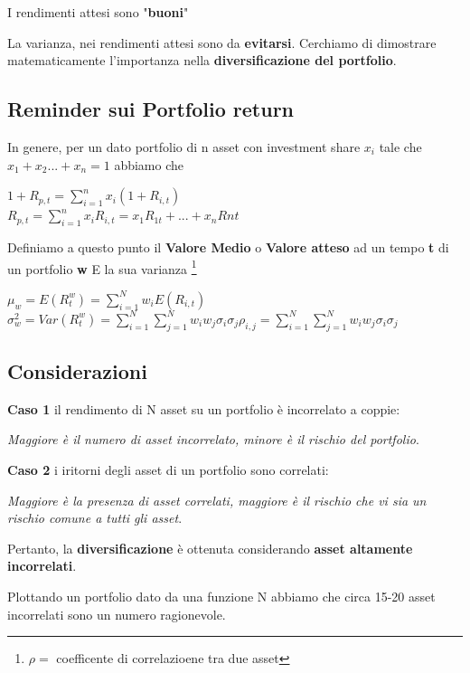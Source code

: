 \documentclass[a4paper,11pt]{report}
\begin{document}
{	I rendimenti attesi sono "\textbf{buoni}"

	La varianza, nei rendimenti attesi sono da \textbf{evitarsi}. \newline
	Cerchiamo di dimostrare matematicamente l'importanza nella \textbf{diversificazione del portfolio}. 
\subsection{Reminder sui Portfolio return}
	In genere, per un dato portfolio di n asset con investment share $x_i$ tale che $x_1+x_2...+x_n = 1$ abbiamo che
\begin{center}
	$1+R_{p,t} = \sum\limits_{i=1}^n x_i(1+R_{i,t}) $\\
	$R_{p,t} =  \sum\limits_{i=1}^n x_i R_{i,t}= x_1 R_{1t}+... + x_n R{nt}$
\end{center}

	Definiamo a questo punto il \textbf{Valore Medio} o \textbf{Valore atteso} ad un tempo \textbf{t} di un portfolio \textbf{w} E la sua varianza \footnote{ $\rho =$ coefficente di correlazioene tra due asset}
\begin{center}
	$\mu_w = E(R_t^w) =  \sum\limits_{i=1}^N w_i E(R_{i,t}) $ 
	$\sigma_w^2 = Var(R_t^w) =  \sum\limits_{i=1}^N  \sum\limits_{j=1}^N w_i w_j \sigma_i \sigma_j \rho_{i,j} =  \sum		\limits_{i=1}^N  \sum\limits_{j=1}^N w_i w_j \sigma_i \sigma_j  $ 
\end{center}
\subsection{Considerazioni}
	\textbf{Caso 1} il rendimento di N asset su un portfolio è incorrelato a coppie:

	\emph{Maggiore è il numero di asset incorrelato, minore è il rischio del portfolio}. 

	\textbf{Caso 2} i iritorni degli asset di un portfolio sono correlati: 

	\emph{Maggiore è la presenza di asset correlati, maggiore è il rischio che vi sia un rischio comune a tutti gli asset}. \newline

	Pertanto, la \textbf{diversificazione} è ottenuta considerando \textbf{asset altamente incorrelati}.

	Plottando un portfolio dato da una funzione N abbiamo che circa 15-20 asset incorrelati sono un numero ragionevole.

\newpage

}
\end{document}

